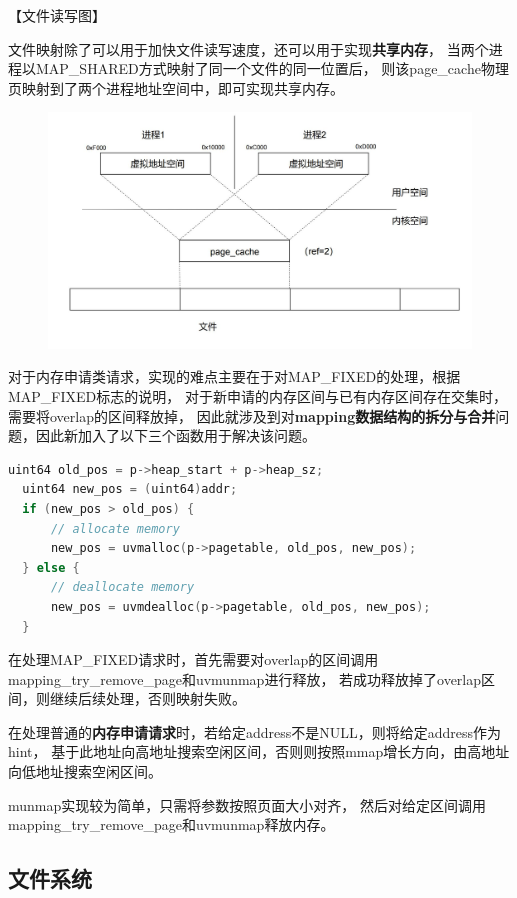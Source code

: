 \documentclass[UTF8,a4paper,10pt]{ctexart}
\begin{document}
【文件读写图】

文件映射除了可以用于加快文件读写速度，还可以用于实现\textbf{共享内存}，
当两个进程以MAP\_SHARED方式映射了同一个文件的同一位置后，
则该page\_cache物理页映射到了两个进程地址空间中，即可实现共享内存。

\begin{figure}[H]
  \centering
  \includegraphics[scale=0.5]{image/mem05.jpg}
\end{figure}


对于内存申请类请求，实现的难点主要在于对MAP\_FIXED的处理，根据MAP\_FIXED标志的说明，
对于新申请的内存区间与已有内存区间存在交集时，需要将overlap的区间释放掉，
因此就涉及到对\textbf{mapping数据结构的拆分与合并}问题，因此新加入了以下三个函数用于解决该问题。

\begin{lstlisting}[title=mapping数据结构的拆分与合并,frame=trbl,language={C}]
  uint64 old_pos = p->heap_start + p->heap_sz;
  uint64 new_pos = (uint64)addr;
  if (new_pos > old_pos) {
      // allocate memory
      new_pos = uvmalloc(p->pagetable, old_pos, new_pos);
  } else {
      // deallocate memory
      new_pos = uvmdealloc(p->pagetable, old_pos, new_pos);
  }
  \end{lstlisting}


在处理MAP\_FIXED请求时，首先需要对overlap的区间调用mapping\_try\_remove\_page和uvmunmap进行释放，
若成功释放掉了overlap区间，则继续后续处理，否则映射失败。

在处理普通的\textbf{内存申请请求}时，若给定address不是NULL，则将给定address作为hint，
基于此地址向高地址搜索空闲区间，否则则按照mmap增长方向，由高地址向低地址搜索空闲区间。

munmap实现较为简单，只需将参数按照页面大小对齐，
然后对给定区间调用mapping\_try\_remove\_page和uvmunmap释放内存。

\subsection{文件系统}
\end{document}
